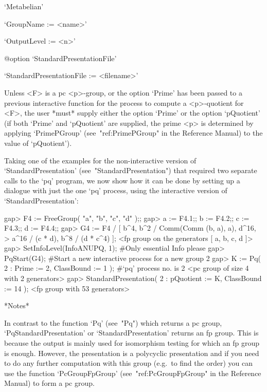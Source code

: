 \item{}`Metabelian'

\item{}`GroupName := <name>'

\item{}`OutputLevel := <n>'

%
{@option \noexpand`StandardPresentationFile'}
\item{}`StandardPresentationFile := <filename>'

\endlist

Unless <F> is a pc <p>-group, or the option `Prime' has been passed to  a
previous interactive function for the process to compute  a  <p>-quotient
for <F>, the user *must* supply either the option `Prime' or  the  option
`pQuotient' (if both `Prime' and `pQuotient' are supplied, the prime  <p>
is determined by applying  `PrimePGroup'  (see~"ref:PrimePGroup"  in  the
Reference Manual) to the value of `pQuotient').

Taking  one  of  the  examples  for  the   non-interactive   version   of
`StandardPresentation'  (see~"StandardPresentation")  that  required  two
separate calls to the `pq' program, we now show how it  can  be  done  by
setting up  a  dialogue  with  just  the  one  `pq'  process,  using  the
interactive version of `StandardPresentation':

\beginexample
gap> F4 := FreeGroup( "a", "b", "c", "d" );;
gap> a := F4.1;; b := F4.2;; c := F4.3;; d := F4.4;;
gap> G4 := F4 / [ b^4, b^2 / Comm(Comm (b, a), a), d^16,
>                 a^16 / (c * d), b^8 / (d * c^4) ];
<fp group on the generators [ a, b, c, d ]>
gap> SetInfoLevel(InfoANUPQ, 1); #Only essential Info please
gap> PqStart(G4); #Start a new interactive process for a new group
2
gap> K := Pq( 2 : Prime := 2, ClassBound := 1 ); #`pq' process no. is 2
<pc group of size 4 with 2 generators>
gap> StandardPresentation( 2 : pQuotient := K, ClassBound := 14 );
<fp group with 53 generators>
\endexample

*Notes*

In contrast  to the  function `Pq' (see~"Pq")  which returns a  pc group,
`PqStandardPresentation' or `StandardPresentation' returns an  fp  group.
This is because the output is mainly used  for  isomorphism  testing  for
which an fp group is enough. However, the presentation  is  a  polycyclic
presentation and if you need to do  any  further  computation  with  this
group (e.g.~to find the order) you can use the function  `PcGroupFpGroup'
(see~"ref:PcGroupFpGroup" in the {\GAP} Reference Manual) to  form  a  pc
group.

